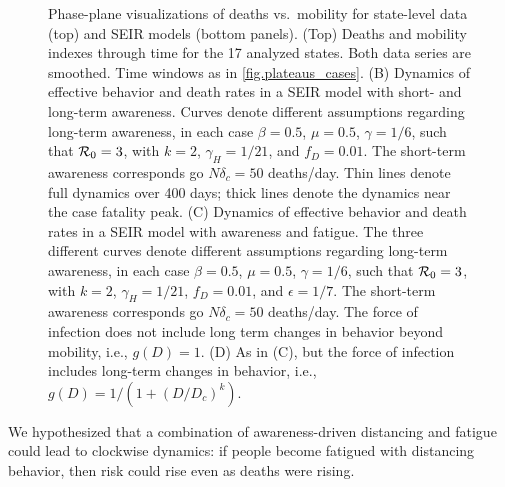\begin{figure}
\begin{center}
\caption{Phase-plane visualizations of deaths vs.~mobility for state-level
data (top) and SEIR models (bottom panels).
(Top) Deaths and mobility indexes through time for the 17 analyzed states. Both data series are smoothed. 
Time windows as in \ref{fig.plateaus_cases}.
(B)
Dynamics of effective behavior and death rates
in a SEIR model with short- and long-term awareness. 
Curves denote different assumptions regarding long-term awareness,
in each case $\beta=0.5$, $\mu=0.5$, $\gamma=1/6$, such that ${\cal{R}}_0=3$,
with $k=2$, $\gamma_H=1/21$, and $f_D=0.01$.  The short-term awareness
corresponds go $N\delta_c=50$ deaths/day. Thin lines denote
full dynamics over 400 days; thick lines denote the dynamics
near the case fatality peak.
(C) Dynamics of effective behavior and death rates
in a SEIR model with awareness and fatigue. The three
different curves denote different assumptions regarding long-term awareness,
in each case $\beta=0.5$, $\mu=0.5$, $\gamma=1/6$, such that ${\cal{R}}_0=3$,
with $k=2$, $\gamma_H=1/21$, $f_D=0.01$, and $\epsilon=1/7$.  
The short-term awareness
corresponds go $N\delta_c=50$ deaths/day. 
The force of infection does not include long term changes in behavior
beyond mobility, i.e., $g(D)=1$.
(D) As in (C), but the force
of infection includes long-term changes in behavior, i.e., 
$g(D)=1/\left(1+(D/D_c)^k\right)$.
\label{fig.phase_real_theory}}
\end{center}
\end{figure}

We hypothesized that
a combination of awareness-driven distancing and fatigue
could lead to clockwise dynamics: if people become fatigued with distancing behavior, then risk could rise even as deaths were rising.

